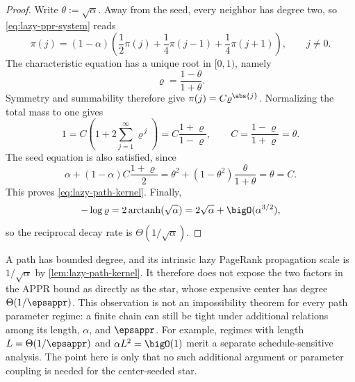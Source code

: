 \begin{proof}
Write \(\theta:=\sqrt{\alpha}\). Away from the seed, every neighbor has degree
two, so \cref{eq:lazy-ppr-system} reads
\begin{equation}
    \pi(j)
    =(1-\alpha)
     \left(
        \frac12\pi(j)
        +\frac14\pi(j-1)
        +\frac14\pi(j+1)
     \right),
    \qquad j\neq0.
    \label{eq:lazy-path-recurrence}
\end{equation}
The characteristic equation has a unique root in \([0,1)\), namely
\begin{equation}
    \varrho
    =\frac{1-\theta}{1+\theta}.
    \label{eq:lazy-path-rho}
\end{equation}
Symmetry and summability therefore give \(\pi(j)=C\varrho^{\abs{j}}\).
Normalizing the total mass to one gives
\begin{equation}
    1
    =C\left(1+2\sum_{j=1}^{\infty}\varrho^{\,j}\right)
    =C\frac{1+\varrho}{1-\varrho},
    \qquad
    C=\frac{1-\varrho}{1+\varrho}=\theta.
    \label{eq:lazy-path-normalization}
\end{equation}
The seed equation is also satisfied, since
\begin{equation}
    \alpha+(1-\alpha)C\frac{1+\varrho}{2}
    =\theta^2+(1-\theta^2)\frac{\theta}{1+\theta}
    =\theta
    =C.
    \label{eq:lazy-path-source-check}
\end{equation}
This proves \cref{eq:lazy-path-kernel}. Finally,
\begin{equation}
    -\log\varrho
    =2\operatorname{arctanh}(\sqrt{\alpha})
    =2\sqrt{\alpha}+\bigO(\alpha^{3/2}),
    \label{eq:lazy-path-decay-rate}
\end{equation}
so the reciprocal decay rate is \(\Theta(1/\sqrt{\alpha})\).
\end{proof}

\begin{remark}
\label{rem:appr-path-caveat}
A path has bounded degree, and its intrinsic lazy PageRank propagation scale is
\(1/\sqrt{\alpha}\) by \cref{lem:lazy-path-kernel}. It therefore does not
expose the two factors in the APPR bound as directly as the star, whose
expensive center has degree \(\Theta(1/\epsappr)\). This observation is not an
impossibility theorem for every path parameter regime: a finite chain can still
be tight under additional relations among its length, \(\alpha\), and
\(\epsappr\). For example, regimes with length \(L=\Theta(1/\epsappr)\) and
\(\alpha L^2=\bigO(1)\) merit a separate schedule-sensitive analysis. The point
here is only that no such additional argument or parameter coupling is needed
for the center-seeded star.
\end{remark}

